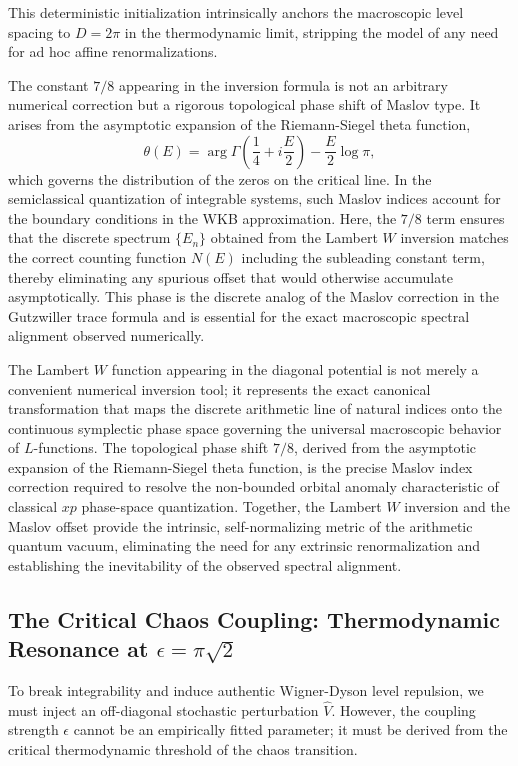 \documentclass[aps,prl,preprint,superscriptaddress,floatfix]{revtex4-2}
\begin{document}
This deterministic initialization intrinsically anchors the macroscopic level spacing to $D = 2\pi$ in the thermodynamic limit, stripping the model of any need for ad hoc affine renormalizations.

The constant $7/8$ appearing in the inversion formula is not an arbitrary numerical correction but a rigorous topological phase shift of Maslov type. It arises from the asymptotic expansion of the Riemann-Siegel theta function,
\begin{equation}
\theta(E) = \arg\Gamma\left(\frac14 + i\frac{E}{2}\right) - \frac{E}{2}\log\pi,
\end{equation}
which governs the distribution of the zeros on the critical line. In the semiclassical quantization of integrable systems, such Maslov indices account for the boundary conditions in the WKB approximation. Here, the $7/8$ term ensures that the discrete spectrum $\{E_n\}$ obtained from the Lambert $W$ inversion matches the correct counting function $N(E)$ including the subleading constant term, thereby eliminating any spurious offset that would otherwise accumulate asymptotically. This phase is the discrete analog of the Maslov correction in the Gutzwiller trace formula and is essential for the exact macroscopic spectral alignment observed numerically.

The Lambert $W$ function appearing in the diagonal potential is not merely a convenient numerical inversion tool; it represents the exact canonical transformation that maps the discrete arithmetic line of natural indices onto the continuous symplectic phase space governing the universal macroscopic behavior of $L$-functions. The topological phase shift $7/8$, derived from the asymptotic expansion of the Riemann-Siegel theta function, is the precise Maslov index correction required to resolve the non-bounded orbital anomaly characteristic of classical $xp$ phase-space quantization. Together, the Lambert $W$ inversion and the Maslov offset provide the intrinsic, self-normalizing metric of the arithmetic quantum vacuum, eliminating the need for any extrinsic renormalization and establishing the inevitability of the observed spectral alignment.

\subsection{The Critical Chaos Coupling: Thermodynamic Resonance at \texorpdfstring{$\epsilon = \pi \sqrt{2}$}{epsilon = pi sqrt(2)}}

To break integrability and induce authentic Wigner-Dyson level repulsion, we must inject an off-diagonal stochastic perturbation $\hat{V}$. However, the coupling strength $\epsilon$ cannot be an empirically fitted parameter; it must be derived from the critical thermodynamic threshold of the chaos transition.
\end{document}
